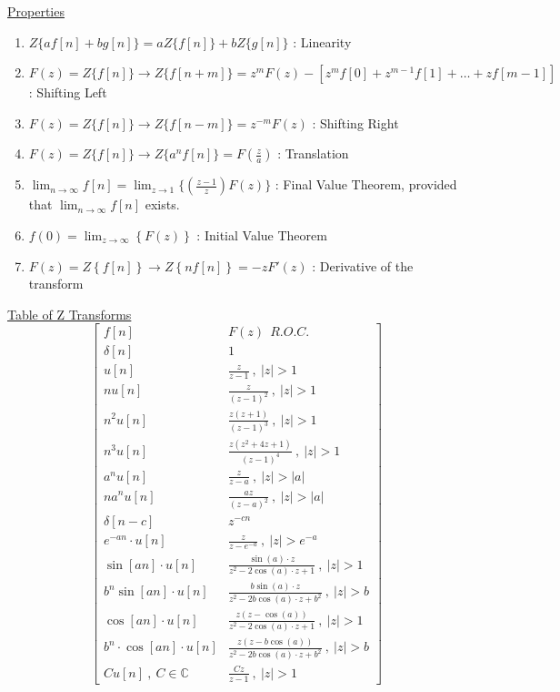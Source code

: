 \documentclass[12pt]{article}
\begin{document}
\begin{flushleft}
	\uline{Properties}  
	\begin{enumerate}
	\item $\displaystyle Z\{af[n] + bg[n] \} = aZ \{ f[n] \} + bZ \{ g[n] \} $  :  Linearity 
	\item $\displaystyle F(z) = Z\{f[n] \} \rightarrow Z \{f[n+m] \} = z^m F(z) - \left[ z^m f[0] + z^{m-1} f[1] + \ldots + zf[m-1] \right]$  :  Shifting Left 
	\item $\displaystyle F(z) = Z\{ f[n] \} \rightarrow Z\{ f[n-m] \} = z^{-m} F(z)$  :  Shifting Right 
	\item $\displaystyle F(z) = Z \{f[n] \} \rightarrow Z \{ a^n f[n] \} = F\left( \frac{z}{a} \right) $  :  Translation 
	\item $\displaystyle \lim_{n\to \infty} f[n] = \lim_{z \to 1} \big\{ \left( \frac{z-1}{z} \right) F(z) \big\} $  :  Final Value Theorem, provided that $\displaystyle \lim_{n\to \infty} f[n]$ exists. 
	\item $\displaystyle f(0) = \lim_{z\to \infty} \left\{ F(z) \right\} $  :  Initial Value Theorem 
	\item $\displaystyle F(z) = Z\left\{ f[n] \right\} \rightarrow Z \left\{ nf[n] \right\} = -z F' (z) $  :  Derivative of the transform 
	\end{enumerate} 
	
	\uline{Table of Z Transforms} \linebreak 
	$$ \begin{bmatrix}
	f[n] & F(z) \ \  R.O.C. \\ 
	\delta[n] & 1 \\ 
	u[n] & \frac{z}{z-1} \ , \ |z| > 1 \\ 
	nu[n] &  \frac{z}{(z-1)^2} \ , \ |z| > 1 \\ 
	n^2u[n] & \frac{z(z+1)}{(z-1)^3} \ , \ |z| > 1 \\ 
	n^3u[n] & \frac{z(z^2+4z+1)}{(z-1)^4} \ , \ |z| > 1 \\ 
	a^n u[n] & \frac{z}{z-a} \ , \ |z| > |a| \\ 
	na^n u[n] & \frac{az}{(z-a)^2} \ , \ |z| > |a| \\ 
	\delta [n-c] & z^{-cn} \\ 
	e^{-an} \cdot u[n] & \frac{z}{z-e^{-a}} \ , \ |z| > e^{-a}  \\ 
	\sin [an] \cdot u[n] & \frac{\sin (a) \cdot z}{z^2 -2\cos (a) \cdot z + 1} \ , \ |z| > 1 \\ 
	b^n \sin [an] \cdot u[n] & \frac{b\sin (a) \cdot z}{z^2 -2b \cos (a) \cdot z +b^2} \ , \ |z| > b \\ 
	\cos [an] \cdot u[n] & \frac{z(z-\cos (a))}{z^2 -2 \cos (a) \cdot z + 1} \ , \ |z| > 1 \\ 
	b^n \cdot \cos [an] \cdot u[n] & \frac{z(z-b\cos (a))}{z^2 -2b \cos (a) \cdot z + b^2} \ , \ |z| > b \\
	C u[n] \ , \ C \in \mathbb{C} & \frac{Cz}{z-1} \ , \ |z| > 1 
	\end{bmatrix} $$
	

\end{flushleft}
\end{document}
